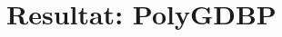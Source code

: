 \documentclass[12pt,usenames,dvipsnames]{beamer}
\begin{document}
\section{Resultat: PolyGDBP}
\end{document}
